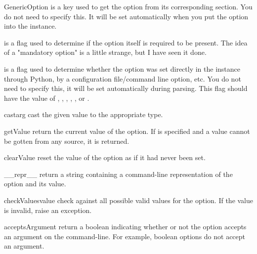 \documentclass{manual}
\begin{document}
\begin{classdesc}{GenericOption}
 is a key used to get the option from its corresponding section.
   You do not need to specify this.  It will be set automatically
   when you put the option into the  instance.

 is a flag used to determine if the option itself is
   required to be present.  The idea of a "mandatory option" is
   a little strange, but I have seen it done.

 is a flag used to determine whether the option was set
   directly in the  instance through Python,
   by a configuration file/command line option, etc.  You do not need
   to specify this, it will be set automatically during parsing.
   This flag should have the value of , ,
   , , , or .
\end{classdesc}

\begin{methoddesc}[GenericOption]{cast}{arg}
cast the given value to the appropriate type.
\end{methoddesc}

\begin{methoddesc}[GenericOption]{getValue}{}
return the current value of the option.  If  is specified
and a value cannot be gotten from any source, it is returned.
\end{methoddesc}

\begin{methoddesc}[GenericOption]{clearValue}{}
reset the value of the option as if it had never been set.
\end{methoddesc}

\begin{methoddesc}[GenericOption]{\_\_repr\_\_}{}
return a string containing a command-line representation of the option and
its value.
\end{methoddesc}

\begin{methoddesc}[GenericOption]{checkValues}{value}
check  against all possible valid values for the option.
If the value is invalid, raise an  exception.
\end{methoddesc}

\begin{methoddesc}[GenericOption]{acceptsArgument}{}
return a boolean indicating whether or not the option accepts an argument on 
the command-line.  For example, boolean options do not accept an argument.
\end{methoddesc}
\end{document}

